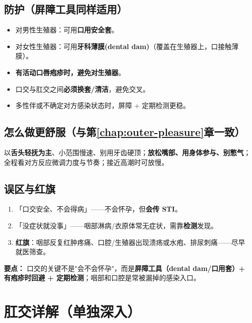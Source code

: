 \documentclass[12pt,UTF8,openany]{ctexbook}
\begin{document}
\section{防护（屏障工具同样适用）}

\begin{itemize}[leftmargin=2em,itemsep=0.3em]
  \item 对男性生殖器：可用\textbf{口用安全套}。
  \item 对女性生殖器：可用\textbf{牙科薄膜(dental dam)}（覆盖在生殖器上，口接触薄膜）。
  \item \textbf{有活动口唇疱疹时，避免对生殖器}。
  \item 口交与肛交之间\textbf{必须换套/清洁}，避免交叉。
  \item 多性伴或不确定对方感染状态时，屏障 + 定期检测更稳。
\end{itemize}

\section{怎么做更舒服（与第\ref{chap:outer-pleasure}章一致）}

以\textbf{舌头轻抚为主}、小范围慢速、别用牙齿硬顶；\textbf{放松嘴部、用身体参与、别憋气}；全程看对方反应微调力度与节奏；接近高潮时可放慢。

\section{误区与红旗}

\begin{enumerate}[leftmargin=2em,itemsep=0.3em]
  \item 「口交安全、不会得病」——不会怀孕，但\textbf{会传 STI}。
  \item 「没症状就没事」——咽部淋病/衣原体常无症状，需靠\textbf{检测}发现。
  \item \textbf{红旗}：咽部反复红肿疼痛、口腔/生殖器出现溃疡或水疱、排尿刺痛——尽早就医筛查。
\end{enumerate}

\vspace{1em}
\noindent\textbf{要点：} 口交的关键不是"会不会怀孕"，而是\textbf{屏障工具（dental dam/口用套）+ 有疱疹时回避 + 定期检测}；咽部和口腔是常被漏掉的感染入口。

\chapter{肛交详解（单独深入）}
\label{chap:anal}
\end{document}
